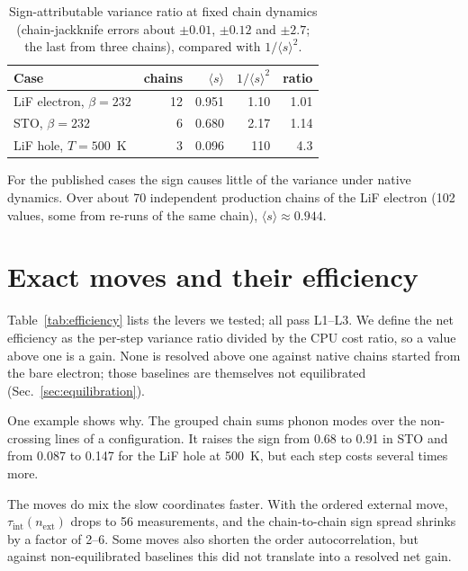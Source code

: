 \documentclass[aps,prb,reprint,superscriptaddress,nofootinbib]{revtex4-2}
\newcommand{\avg}[1]{\langle #1\rangle}
\newcommand{\tauint}{\tau_{\mathrm{int}}}
\begin{document}
\begin{table}
\caption{\label{tab:ceiling}Sign-attributable variance ratio at fixed chain dynamics (chain-jackknife errors about $\pm0.01$, $\pm0.12$ and $\pm2.7$; the last from three chains), compared with $1/\avg{s}^2$.}
\begin{ruledtabular}
\begin{tabular}{lrrrr}
Case & chains & $\avg{s}$ & $1/\avg{s}^2$ & ratio \\
\midrule
LiF electron, $\beta=232$ & 12 & 0.951 & 1.10 & 1.01 \\
STO, $\beta=232$ & 6 & 0.680 & 2.17 & 1.14 \\
LiF hole, $T=500$~K & 3 & 0.096 & 110 & 4.3 \\
\end{tabular}
\end{ruledtabular}
\end{table}

For the published cases the sign causes little of the variance under native dynamics. Over about 70 independent production chains of the LiF electron (102 values, some from re-runs of the same chain), $\avg{s}\approx0.944$.

\section{Exact moves and their efficiency}
\label{sec:negative}

Table~\ref{tab:efficiency} lists the levers we tested; all pass L1--L3. We define the net efficiency as the per-step variance ratio divided by the CPU cost ratio, so a value above one is a gain. None is resolved above one against native chains started from the bare electron; those baselines are themselves not equilibrated (Sec.~\ref{sec:equilibration}).

One example shows why. The grouped chain sums phonon modes over the non-crossing lines of a configuration. It raises the sign from 0.68 to 0.91 in STO and from 0.087 to 0.147 for the LiF hole at 500~K, but each step costs several times more.

The moves do mix the slow coordinates faster. With the ordered external move, $\tauint(n_{\mathrm{ext}})$ drops to 56 measurements, and the chain-to-chain sign spread shrinks by a factor of 2--6. Some moves also shorten the order autocorrelation, but against non-equilibrated baselines this did not translate into a resolved net gain.
\end{document}
